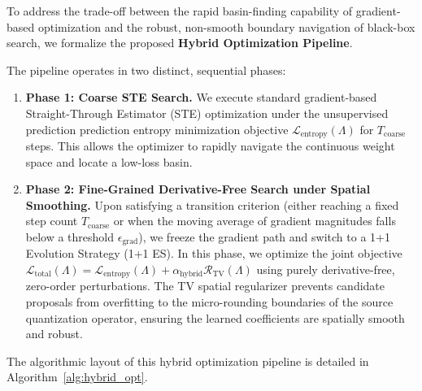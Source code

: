\documentclass{article}
\theoremstyle{plain}
\theoremstyle{definition}
\theoremstyle{remark}
\begin{document}
To address the trade-off between the rapid basin-finding capability of gradient-based optimization and the robust, non-smooth boundary navigation of black-box search, we formalize the proposed \textbf{Hybrid Optimization Pipeline}. 

The pipeline operates in two distinct, sequential phases:
\begin{enumerate}
    \item \textbf{Phase 1: Coarse STE Search.} We execute standard gradient-based Straight-Through Estimator (STE) optimization under the unsupervised prediction prediction entropy minimization objective $\mathcal{L}_{\text{entropy}}(\Lambda)$ for $T_{\text{coarse}}$ steps. This allows the optimizer to rapidly navigate the continuous weight space and locate a low-loss basin.
    \item \textbf{Phase 2: Fine-Grained Derivative-Free Search under Spatial Smoothing.} Upon satisfying a transition criterion (either reaching a fixed step count $T_{\text{coarse}}$ or when the moving average of gradient magnitudes falls below a threshold $\epsilon_{\text{grad}}$), we freeze the gradient path and switch to a 1+1 Evolution Strategy (1+1 ES). In this phase, we optimize the joint objective $\mathcal{L}_{\text{total}}(\Lambda) = \mathcal{L}_{\text{entropy}}(\Lambda) + \alpha_{\text{hybrid}} \mathcal{R}_{\text{TV}}(\Lambda)$ using purely derivative-free, zero-order perturbations. The TV spatial regularizer prevents candidate proposals from overfitting to the micro-rounding boundaries of the source quantization operator, ensuring the learned coefficients are spatially smooth and robust.
\end{enumerate}

The algorithmic layout of this hybrid optimization pipeline is detailed in Algorithm~\ref{alg:hybrid_opt}.
\end{document}
